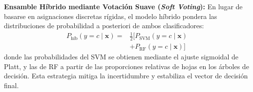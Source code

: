 \textbf{Ensamble Híbrido mediante Votación Suave (\textit{Soft Voting}):} En lugar de basarse en asignaciones discretas rígidas, el modelo híbrido pondera las distribuciones de probabilidad a posteriori de ambos clasificadores:
\begin{equation}
\begin{aligned}
P_{\text{híb}}(y = c \mid \mathbf{x}) = {} & \frac{1}{2} \big[ P_{\text{SVM}}(y = c \mid \mathbf{x}) \\
& + P_{\text{RF}}(y = c \mid \mathbf{x}) \big]
\end{aligned}
\end{equation}
donde las probabilidades del SVM se obtienen mediante el ajuste sigmoidal de Platt, y las de RF a partir de las proporciones relativas de hojas en los árboles de decisión. Esta estrategia mitiga la incertidumbre y estabiliza el vector de decisión final.
